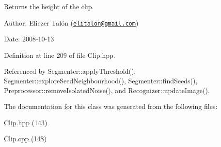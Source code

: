 Returns the height of the clip. 

\begin{Desc}
\item[Author:]Eliezer Talón (\href{mailto:elitalon@gmail.com}{\tt elitalon@gmail.com}) \end{Desc}
\begin{Desc}
\item[Date:]2008-10-13 \end{Desc}


Definition at line 209 of file Clip.hpp.

Referenced by Segmenter::applyThreshold(), Segmenter::exploreSeedNeighbourhood(), Segmenter::findSeeds(), Preprocessor::removeIsolatedNoise(), and Recognizer::updateImage().

The documentation for this class was generated from the following files:\begin{CompactItemize}
\item 
\hyperlink{_clip_8hpp}{Clip.hpp (143)}\item 
\hyperlink{_clip_8cpp}{Clip.cpp (148)}\end{CompactItemize}
